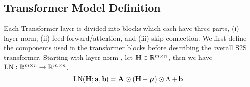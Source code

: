 



\subsection{Transformer Model Definition}

Each Transformer layer is divided into blocks which each have three
parts, (i) layer norm, (ii) feed-forward/attention, and  (iii) skip-connection.
We first define the components used in the transformer blocks before
describing the overall S2S transformer. 
Starting with layer norm \cite{ba2016}, let $\mathbf{H} \in \mathbb{R}^{m\times n}$, then we have
$\operatorname{LN} : \mathbb{R}^{m \times n} \rightarrow \mathbb{R}^{m \times n}$,
\[\operatorname{LN}(\mathbf{H}; \mathbf{a}, \mathbf{b}) = \mathbf{A} \odot (\mathbf{H} - \boldsymbol{\mu}) \odot \Lambda + \mathbf{b} \]


